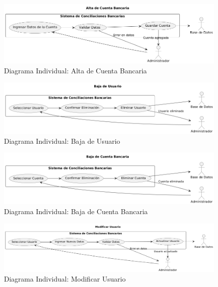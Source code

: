 \documentclass{article}
\begin{document}
\begin{figure}[H]
    \centering
    \includegraphics[width=\textwidth]{casos/AltaCuentaBancaria.png}
    \caption{Diagrama Individual: Alta de Cuenta Bancaria}
\end{figure}

\begin{figure}[H]
    \centering
    \includegraphics[width=\textwidth]{casos/BajaUsuario.png}
    \caption{Diagrama Individual: Baja de Usuario}
\end{figure}

\begin{figure}[H]
    \centering
    \includegraphics[width=\textwidth]{casos/BajaCuentaBancaria.png}
    \caption{Diagrama Individual: Baja de Cuenta Bancaria}
\end{figure}

\begin{figure}[H]
    \centering
    \includegraphics[width=\textwidth]{casos/ModificarUsuario.png}
    \caption{Diagrama Individual: Modificar Usuario}
\end{figure}
\end{document}
